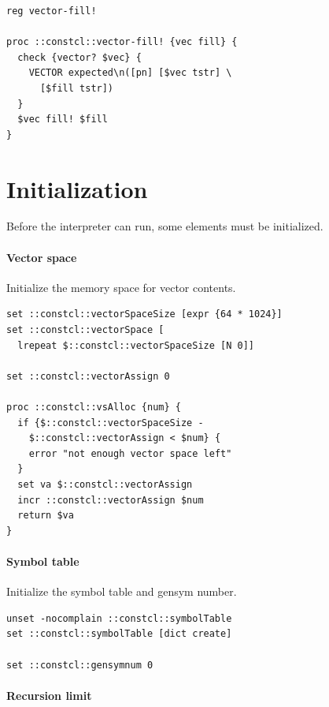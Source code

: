 \documentclass[twoside]{report}
\begin{document}
\begin{lstlisting}
reg vector-fill!

proc ::constcl::vector-fill! {vec fill} {
  check {vector? $vec} {
    VECTOR expected\n([pn] [$vec tstr] \
      [$fill tstr])
  }
  $vec fill! $fill
}
\end{lstlisting}

\chapter{Initialization}
\label{initialization}

Before the interpreter can run, some elements must be initialized.

\subsubsection{Vector space}
\label{vector-space}

Initialize the memory space for vector contents.

\begin{lstlisting}
set ::constcl::vectorSpaceSize [expr {64 * 1024}]
set ::constcl::vectorSpace [
  lrepeat $::constcl::vectorSpaceSize [N 0]]

set ::constcl::vectorAssign 0

proc ::constcl::vsAlloc {num} {
  if {$::constcl::vectorSpaceSize -
    $::constcl::vectorAssign < $num} {
    error "not enough vector space left"
  }
  set va $::constcl::vectorAssign
  incr ::constcl::vectorAssign $num
  return $va
}
\end{lstlisting}

\subsubsection{Symbol table}
\label{symbol-table}

Initialize the symbol table and gensym number.

\begin{lstlisting}
unset -nocomplain ::constcl::symbolTable
set ::constcl::symbolTable [dict create]

set ::constcl::gensymnum 0
\end{lstlisting}

\subsubsection{Recursion limit}
\label{recursion-limit}
\end{document}
